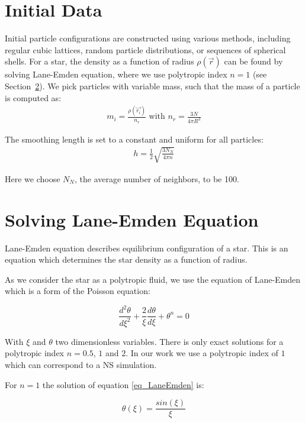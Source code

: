 \documentclass[notes.tex]{subfiles}
\begin{document}
\section{Initial Data}
\label{sec:equi}

Initial particle configurations are constructed using various methods,
including regular cubic lattices, random particle distributions, or sequences
of spherical shells. 
For a star, the density as a function of radius $\rho(\vec{r})$ can be found
by solving Lane-Emden equation, where we use polytropic index $n = 1$
(see Section~\ref{sec:Lane-Emden}).
We pick particles with variable mass, such that the mass of a particle is
computed as:
\begin{align}
  m_i = \frac{\rho(\vec{r_i})}{n_r} \mbox{ with } n_r = \frac{3N}{4 \pi R^3}
\end{align}  

The smoothing length is set to a constant and uniform for all particles:
\begin{align}
  h = \frac{1}{2}\sqrt{\frac{3N_N}{4\pi n}}
\end{align}

Here we choose $N_N$, the average number of neighbors, to be 100.

\section{Solving Lane-Emden Equation}
\label{sec:Lane-Emden}

Lane-Emden equation describes equilibrium configuration of a star. This is an
equation which determines the star density as a function of radius.

As we consider the star as a polytropic fluid, we use the equation of Lane-Emden which is a form of the Poisson equation:

\begin{equation}\label{eq_LaneEmden}
  \frac{d^2\theta}{d \xi^2}+ \frac{2}{\xi}\frac{d\theta}{d\xi}+\theta^n = 0
\end{equation}

With $\xi$ and $\theta$ two dimensionless variables.
There is only exact solutions for a polytropic index $n = 0.5$, $1$ and $2$.
In our work we use a polytropic index of $1$ which can correspond to a NS simulation.

For $n=1$ the solution of equation \ref{eq_LaneEmden} is:

\begin{equation}
\theta(\xi)=\frac{sin(\xi)}{\xi}
\end{equation}
\end{document}

